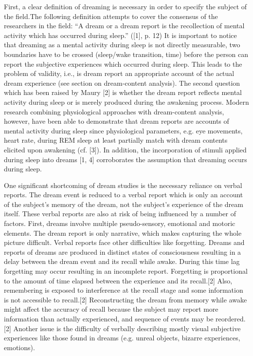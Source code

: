 First, a clear definition of dreaming is necessary
in order to specify the subject of the field.The following
definition attempts to cover the consensus
of the researchers in the field:
“A dream or a dream report is the recollection
of mental activity which has occurred during sleep.”
([1], p. 12)
It is important to notice that dreaming as a mental
activity during sleep is not directly measurable,
two boundaries have to be crossed (sleep/wake
transition, time) before the person can report the
subjective experiences which occurred during
sleep. This leads to the problem of validity, i.e., is
dream report an appropriate account of the actual
dream experience (see section on dream-content
analysis). The second question which has been
raised by Maury [2] is whether the dream report
reflects mental activity during sleep or is merely
produced during the awakening process. Modern
research combining physiological approaches with
dream-content analysis, however, have been able
to demonstrate that dream reports are accounts
of mental activity during sleep since physiological
parameters, e.g. eye movements, heart rate, during
REM sleep at least partially match with dream contents
elicited upon awakening (cf. [3]). In addition,
the incorporation of stimuli applied during sleep
into dreams [1, 4] corroborates the assumption that
dreaming occurs during sleep.

One significant shortcoming of dream studies is the necessary reliance on verbal reports.
The dream event is reduced to a verbal report which is only an account of the subject's memory of the dream,
not the subject's experience of the dream itself. These verbal reports are also at risk of being influenced by a
number of factors. First, dreams involve multiple pseudo-sensory, emotional and motoric elements.
The dream report is only narrative, which makes capturing the whole picture difficult.
Verbal reports face other difficulties like forgetting. Dreams and reports of dreams are produced in distinct states
of consciousness resulting in a delay between the dream event and its recall while awake.
During this time lag forgetting may occur resulting in an incomplete report. Forgetting is proportional to the amount
of time elapsed between the experience and its recall.[2] Also, remembering is exposed to interference at the recall
stage and some information is not accessible to recall.[2] Reconstructing the dream from memory while awake might
affect the accuracy of recall because the subject may report more information than actually experienced, and sequence
of events may be reordered.[2] Another issue is the difficulty of verbally describing mostly visual subjective
experiences like those found in dreams (e.g. unreal objects, bizarre experiences, emotions).

